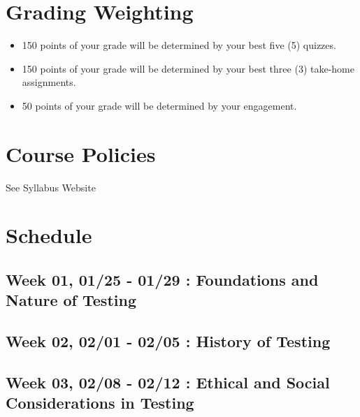 \documentclass[
]{book}
\providecommand{\tightlist}{%
  \setlength{\itemsep}{0pt}\setlength{\parskip}{0pt}}
\begin{document}
\hypertarget{grading-weighting}{%
\section{Grading Weighting}\label{grading-weighting}}

\begin{itemize}
\tightlist
\item
  150 points of your grade will be determined by your best five (5) quizzes.
\item
  150 points of your grade will be determined by your best three (3) take-home assignments.
\item
  50 points of your grade will be determined by your engagement.
\end{itemize}

\hypertarget{course-policies}{%
\section{Course Policies}\label{course-policies}}

See Syllabus Website

\hypertarget{schedule-1}{%
\section{Schedule}\label{schedule-1}}

\hypertarget{week-01-0125---0129-foundations-and-nature-of-testing}{%
\subsection{Week 01, 01/25 - 01/29 : Foundations and Nature of Testing}\label{week-01-0125---0129-foundations-and-nature-of-testing}}

\hypertarget{week-02-0201---0205-history-of-testing}{%
\subsection{Week 02, 02/01 - 02/05 : History of Testing}\label{week-02-0201---0205-history-of-testing}}

\hypertarget{week-03-0208---0212-ethical-and-social-considerations-in-testing}{%
\subsection{Week 03, 02/08 - 02/12 : Ethical and Social Considerations in Testing}\label{week-03-0208---0212-ethical-and-social-considerations-in-testing}}
\end{document}
